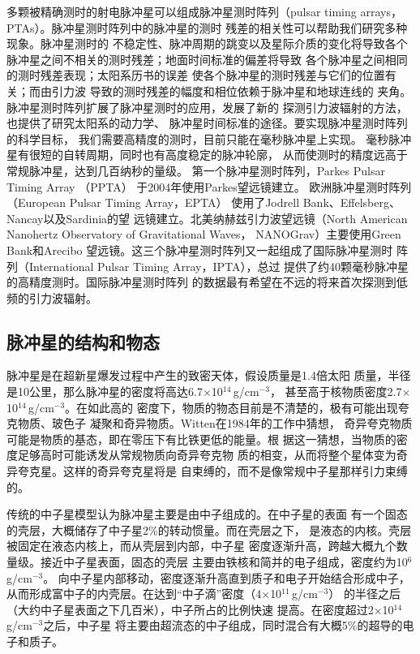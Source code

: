 多颗被精确测时的射电脉冲星可以组成脉冲星测时阵列（pulsar 
timing arrays，PTAs）。脉冲星测时阵列中的脉冲星的测时
残差的相关性可以帮助我们研究多种现象。脉冲星测时的
不稳定性、脉冲周期的跳变以及星际介质的变化将导致各个
脉冲星之间不相关的测时残差；地面时间标准的偏差将导致
各个脉冲星之间相同的测时残差表现；太阳系历书的误差
使各个脉冲星的测时残差与它们的位置有关；而由引力波
导致的测时残差的幅度和相位依赖于脉冲星和地球连线的
夹角。脉冲星测时阵列扩展了脉冲星测时的应用，发展了新的
探测引力波辐射的方法，也提供了研究太阳系的动力学、
脉冲星时间标准的途径。要实现脉冲星测时阵列的科学目标，
我们需要高精度的测时，目前只能在毫秒脉冲星上实现。
毫秒脉冲星有很短的自转周期，同时也有高度稳定的脉冲轮廓，
从而使测时的精度远高于常规脉冲星，达到几百纳秒的量级。
第一个脉冲星测时阵列，Parkes Pulsar Timing Array （PPTA）
于2004年使用Parkes望远镜建立\supercite{Manchester13}。
欧洲脉冲星测时阵列（European Pulsar Timing Array，EPTA）\supercite{fvr+10}
使用了Jodrell Bank、Effelsberg、Nancay以及Sardinia的望
远镜建立。北美纳赫兹引力波望远镜（North American Nanohertz Observatory of Gravitational Waves，
NANOGrav）\supercite{jfl+09}主要使用Green Bank和Arecibo
望远镜。这三个脉冲星测时阵列又一起组成了国际脉冲星测时
阵列（International Pulsar Timing Array，IPTA），总过
提供了约40颗毫秒脉冲星的高精度测时。国际脉冲星测时阵列
的数据最有希望在不远的将来首次探测到低频的引力波辐射。

\subsection{脉冲星的结构和物态}

脉冲星是在超新星爆发过程中产生的致密天体，假设质量是1.4倍太阳
质量，半径是10公里，那么脉冲星的密度将高达6.7$\times$10$^{14}$\,g/cm$^{-3}$，
甚至高于核物质密度2.7$\times$10$^{14}$\,g/cm$^{-3}$。在如此高的
密度下，物质的物态目前是不清楚的，极有可能出现夸克物质、玻色子
凝聚和奇异物质。Witten在1984年的工作中猜想\supercite{wit84}，
奇异夸克物质可能是物质的基态，即在零压下有比铁更低的能量。根
据这一猜想，当物质的密度足够高时可能诱发从常规物质向奇异夸克物
质的相变，从而将整个星体变为奇异夸克星。这样的奇异夸克星将是
自束缚的，而不是像常规中子星那样引力束缚的。

传统的中子星模型认为脉冲星主要是由中子组成的。在中子星的表面
有一个固态的壳层，大概储存了中子星2\%的转动惯量。而在壳层之下，
是液态的内核。壳层被固定在液态内核上，而从壳层到内部，中子星
密度逐渐升高，跨越大概九个数量级。接近中子星表面，固态的壳层
主要由铁核和简并的电子组成，密度约为10$^{6}$\,g/cm$^{-3}$。
向中子星内部移动，密度逐渐升高直到质子和电子开始结合形成中子，
从而形成富中子的内壳层。在达到“中子滴”密度（4$\times$10$^{11}$\,g/cm$^{-3}$）
的半径之后（大约中子星表面之下几百米），中子所占的比例快速
提高。在密度超过2$\times$10$^{14}$\,g/cm$^{-3}$之后，中子星
将主要由超流态的中子组成，同时混合有大概5\%的超导的电子和质子。

